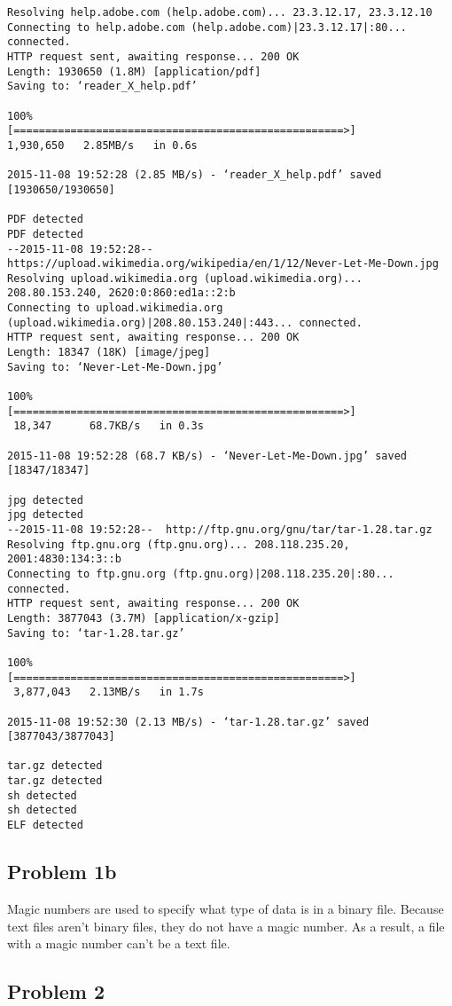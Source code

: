 \documentclass[12pt, a4paper, oneside]{article}
\begin{document}
\begin{lstlisting}
Resolving help.adobe.com (help.adobe.com)... 23.3.12.17, 23.3.12.10
Connecting to help.adobe.com (help.adobe.com)|23.3.12.17|:80... connected.
HTTP request sent, awaiting response... 200 OK
Length: 1930650 (1.8M) [application/pdf]
Saving to: ‘reader_X_help.pdf’

100%
[====================================================>] 
1,930,650   2.85MB/s   in 0.6s   

2015-11-08 19:52:28 (2.85 MB/s) - ‘reader_X_help.pdf’ saved [1930650/1930650]

PDF detected
PDF detected
--2015-11-08 19:52:28--  https://upload.wikimedia.org/wikipedia/en/1/12/Never-Let-Me-Down.jpg
Resolving upload.wikimedia.org (upload.wikimedia.org)... 208.80.153.240, 2620:0:860:ed1a::2:b
Connecting to upload.wikimedia.org (upload.wikimedia.org)|208.80.153.240|:443... connected.
HTTP request sent, awaiting response... 200 OK
Length: 18347 (18K) [image/jpeg]
Saving to: ‘Never-Let-Me-Down.jpg’

100%
[====================================================>]
 18,347      68.7KB/s   in 0.3s   

2015-11-08 19:52:28 (68.7 KB/s) - ‘Never-Let-Me-Down.jpg’ saved [18347/18347]

jpg detected
jpg detected
--2015-11-08 19:52:28--  http://ftp.gnu.org/gnu/tar/tar-1.28.tar.gz
Resolving ftp.gnu.org (ftp.gnu.org)... 208.118.235.20, 2001:4830:134:3::b
Connecting to ftp.gnu.org (ftp.gnu.org)|208.118.235.20|:80... connected.
HTTP request sent, awaiting response... 200 OK
Length: 3877043 (3.7M) [application/x-gzip]
Saving to: ‘tar-1.28.tar.gz’

100%
[====================================================>]
 3,877,043   2.13MB/s   in 1.7s   

2015-11-08 19:52:30 (2.13 MB/s) - ‘tar-1.28.tar.gz’ saved [3877043/3877043]

tar.gz detected
tar.gz detected
sh detected
sh detected
ELF detected
\end{lstlisting}

\subsection*{Problem 1b}
Magic numbers are used to specify what type of data is in a binary file. Because text files aren't binary files, they do not have a magic number. As a result, a file with a magic number can't be a text file.

\subsection*{Problem 2}
\end{document}
